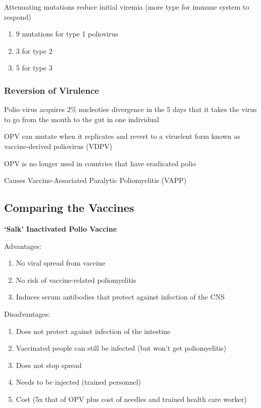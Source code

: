 \documentclass{notes}
\begin{document}
\tab Attenuating mutations reduce initial viremia (more type for immune system to respond)

\begin{enumerate}
    \item 9 mutations for type 1 poliovirus
    \item 3 for type 2
    \item 5 for type 3
\end{enumerate}

\subsubsection{Reversion of Virulence}

Polio virus acquires 2\% nucleotiee divergence in the 5 days that it takes the virus to go from the mouth to the gut in one individual

OPV can mutate when it replicates and revert to a viruelent form known as vaccine-derived poliovirus (VDPV)

\tab OPV is no longer used in countries that have eradicated polio

\tab Causes Vaccine-Associated Paralytic Poliomyelitis (VAPP)

\subsection{Comparing the Vaccines}

\textbf{`Salk' Inactivated Polio Vaccine}

Advantages:

\begin{enumerate}
    \item No viral spread from vaccine
    \item No risk of vaccine-related poliomyelitis
    \item Induces serum antibodies that protect against infection of the CNS
\end{enumerate}

Disadvantages:

\begin{enumerate}
    \item Does not protect against infection of the intestine
    \item Vaccinated people can still be infected (but won't get poliomyelitis)
    \item Does not stop spread
    \item Needs to be injected (trained personnel)
    \item Cost (5x that of OPV plus cost of needles and trained health care worker)
\end{enumerate}
\end{document}
